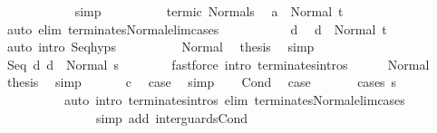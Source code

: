\begin{isabellebody}
\ \ \ \ \ \ \ \ \ \ \isamarkupfalse%
\ simp\isanewline
\ \ \ \ \ \ \ \ \isamarkupfalse%
\ termi{\isacharunderscore}c{}\ Normal{\isacharunderscore}s\ \isamarkupfalse%
\ {\isachardoublequoteopen}{\isasymGamma}{\isasymturnstile}a{}\ {\isasymdown}\ Normal\ t{\isacharprime}{\isachardoublequoteclose}\isanewline
\ \ \ \ \ \ \ \ \ \ \isamarkupfalse%
\ {\isacharparenleft}auto\ elim{\isacharcolon}\ terminates{\isacharunderscore}Normal{\isacharunderscore}elim{\isacharunderscore}cases{\isacharparenright}\ \isanewline
\ \ \ \ \ \ \ \ \isamarkupfalse%
\ d{}\ \isamarkupfalse%
\ {\isachardoublequoteopen}{\isasymGamma}{\isasymturnstile}d{}\ {\isasymdown}\ Normal\ t{\isacharprime}{\isachardoublequoteclose}\isanewline
\ \ \ \ \ \ \ \ \ \ \isamarkupfalse%
\ {\isacharparenleft}auto\ intro{\isacharcolon}\ Seq{\isachardot}hyps{\isacharparenright}\isanewline
\ \ \ \ \ \ \ \ \isamarkupfalse%
\ Normal\ \isamarkupfalse%
\ {\isacharquery}thesis\ \isamarkupfalse%
\ simp\ \ \isanewline
\ \ \ \ \ \ \isamarkupfalse%
\isanewline
\ \ \ \ \isacommand{{\isacharbraceright}}\isamarkupfalse%
\isanewline
\ \ \ \ \isamarkupfalse%
\ \isamarkupfalse%
\ {\isachardoublequoteopen}{\isasymGamma}{\isasymturnstile}Seq\ d{}\ d{}\ {\isasymdown}\ Normal\ s{\isacharprime}{\isachardoublequoteclose}\isanewline
\ \ \ \ \ \ \isamarkupfalse%
\ {\isacharparenleft}fastforce\ intro{\isacharcolon}\ terminates{\isachardot}intros{\isacharparenright}\isanewline
\ \ \ \ \isamarkupfalse%
\ Normal\ \isamarkupfalse%
\ {\isacharquery}thesis\ \isamarkupfalse%
\ simp\isanewline
\ \ \isamarkupfalse%
\isanewline
\ \ \isamarkupfalse%
\ c\ \isamarkupfalse%
\ {\isacharquery}case\ \isamarkupfalse%
\ simp\isanewline
{}\isamarkupfalse%
\isanewline
\ \ \isamarkupfalse%
\ Cond\ \isamarkupfalse%
\ {\isacharquery}case\isanewline
\ \ \ \ \isamarkupfalse%
\ {\isacharminus}\ {\isacharparenleft}cases\ s{\isacharcomma}\isanewline
\ \ \ \ \ \ \ \ \ \ auto\ intro{\isacharcolon}\ terminates{\isachardot}intros\ elim{\isacharbang}{\isacharcolon}\ terminates{\isacharunderscore}Normal{\isacharunderscore}elim{\isacharunderscore}cases\isanewline
\ \ \ \ \ \ \ \ \ \ \ \ \ \ \ simp\ add{\isacharcolon}\ inter{\isacharunderscore}guards{\isacharunderscore}Cond{\isacharparenright}\isanewline

\end{isabellebody}
